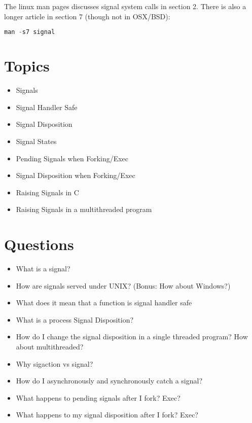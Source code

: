 The linux man pages discusses signal system calls in section 2. There is also a longer article in section 7 (though not in OSX/BSD):

\begin{lstlisting}[language=C]
man -s7 signal
\end{lstlisting}

\section{Topics}

\begin{itemize}
\tightlist
\item
  Signals
\item
  Signal Handler Safe
\item
  Signal Disposition
\item
  Signal States
\item
  Pending Signals when Forking/Exec
\item
  Signal Disposition when Forking/Exec
\item
  Raising Signals in C
\item
  Raising Signals in a multithreaded program
\end{itemize}

\section{Questions}

\begin{itemize}
\tightlist
\item
  What is a signal?
\item
  How are signals served under UNIX? (Bonus: How about Windows?)
\item
  What does it mean that a function is signal handler safe
\item
  What is a process Signal Disposition?
\item
  How do I change the signal disposition in a single threaded program?
  How about multithreaded?
\item
  Why sigaction vs signal?
\item
  How do I asynchronously and synchronously catch a signal?
\item
  What happens to pending signals after I fork? Exec?
\item
  What happens to my signal disposition after I fork? Exec?
\end{itemize}



